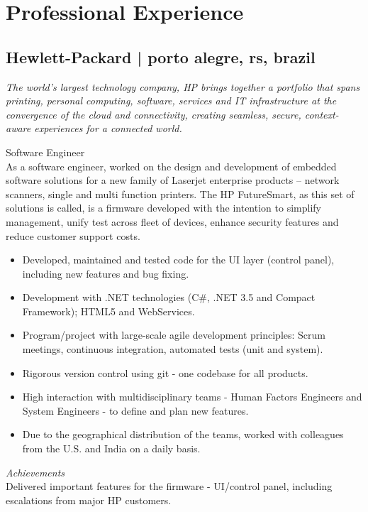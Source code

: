 \documentclass[10pt,a4paper]{article}
\newcommand{\years}[1]{\marginnote{{\small #1}}}
\begin{document}
{%
\section*{Professional Experience}

\subsection*{Hewlett-Packard | {\footnotesize{porto alegre, rs, brazil}}}
{\footnotesize\textit{The world’s largest technology company, HP brings together a portfolio that spans printing, personal computing, software, services and IT infrastructure at the convergence of the cloud and connectivity, creating seamless, secure, context-aware experiences for a connected world.}}
\medskip

\years{Jul 2010 -\\Feb 2012}Software Engineer\\
As a software engineer, worked on the design and development of embedded software solutions for a new family of Laserjet enterprise products – network scanners, single and multi function printers. The HP FutureSmart, as this set of solutions is called, is a firmware developed with the intention to simplify management, unify test across fleet of devices, enhance security features and reduce customer support costs.
\begin{itemize}
  \item Developed, maintained and tested code for the UI layer (control panel), including new features and bug fixing.
  \item Development with .NET technologies (C\#, .NET 3.5 and Compact Framework); HTML5 and WebServices.
  \item Program/project with large-scale agile development principles: Scrum meetings, continuous integration, automated tests (unit and system).
  \item Rigorous version control using git - one codebase for all products.
  \item High interaction with multidisciplinary teams - Human Factors Engineers and System Engineers - to define and plan new features.
  \item Due to the geographical distribution of the teams, worked with colleagues from the U.S. and India on a daily basis.
\end{itemize}
\emph{Achievements}\\
Delivered important features for the firmware - UI/control panel, including escalations from major HP customers.

}
\end{document}
